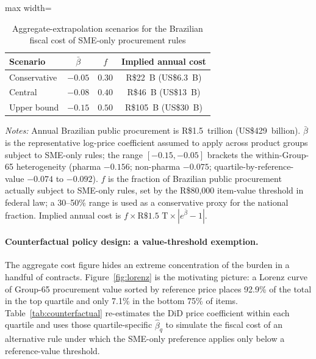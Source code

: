 \begin{table}[htbp]
\centering
\caption{Aggregate-extrapolation scenarios for the Brazilian fiscal cost of SME-only procurement rules}
\label{tab:aggregate_bounds}
\begin{adjustbox}{max width=\textwidth}
\begin{threeparttable}
\small
\begin{tabular}{lccc}
\toprule
Scenario & $\bar\beta$ & $f$ & Implied annual cost \\
\midrule
Conservative & $-0.05$ & $0.30$ & R\$22~B (US\$6.3~B) \\
Central      & $-0.08$ & $0.40$ & R\$46~B (US\$13~B)  \\
Upper bound  & $-0.15$ & $0.50$ & R\$105~B (US\$30~B) \\
\bottomrule
\end{tabular}
\begin{tablenotes}
\small
\item \textit{Notes:} Annual Brazilian public procurement is R\$1.5~trillion (US\$429~billion).
$\bar\beta$ is the representative log-price coefficient assumed to apply across
product groups subject to SME-only rules; the range $[-0.15, -0.05]$ brackets
the within-Group-65 heterogeneity (pharma $-0.156$; non-pharma $-0.075$;
quartile-by-reference-value $-0.074$ to $-0.092$). $f$ is the fraction of
Brazilian public procurement actually subject to SME-only rules, set by the
R\$80{,}000 item-value threshold in federal law; a 30--50\% range is used as
a conservative proxy for the national fraction. Implied annual cost is
$f \times \text{R\$1.5~T} \times |e^{\bar\beta} - 1|$.
\end{tablenotes}
\end{threeparttable}
\end{adjustbox}
\end{table}

\paragraph{Counterfactual policy design: a value-threshold exemption.}
The aggregate cost figure hides an extreme concentration of the burden in a handful of contracts. Figure~\ref{fig:lorenz} is the motivating picture: a Lorenz curve of Group-65 procurement value sorted by reference price places 92.9\% of the total in the top quartile and only 7.1\% in the bottom 75\% of items. Table~\ref{tab:counterfactual} re-estimates the DiD price coefficient within each quartile and uses those quartile-specific $\hat\beta_q$ to simulate the fiscal cost of an alternative rule under which the SME-only preference applies only below a reference-value threshold.

